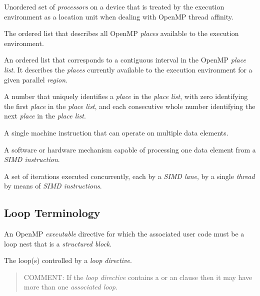 \newpage
{}
\glossarydefstart
Unordered set of \emph{processors} on a device that is treated by the execution environment as a 
location unit when dealing with OpenMP thread affinity.
\glossarydefend

\glossarydefstart
The ordered list that describes all OpenMP \emph{places} available to the execution 
environment.
\glossarydefend

\glossarydefstart
An ordered list that corresponds to a contiguous interval in the OpenMP \emph{place list}. 
It describes the \emph{places} currently available to the execution environment for a given 
parallel \emph{region}.
\glossarydefend

\glossarydefstart
A number that uniquely identifies a \emph{place} in the \emph{place list}, with zero identifying the first \emph{place} in the \emph{place list}, and each consecutive whole number identifying the next \emph{place} in the \emph{place list}.
\glossarydefend

\glossarydefstart
A single machine instruction that can operate on multiple data elements.
\glossarydefend

\glossarydefstart
A software or hardware mechanism capable of processing one data element from a 
\emph{SIMD instruction}.
\glossarydefend

\glossarydefstart
A set of iterations executed concurrently, each by a \emph{SIMD lane}, by a single \emph{thread}
by means of \emph{SIMD instructions}.
\glossarydefend


%
%
\subsection{Loop Terminology}
\label{subsec:Loop Terminology}
\glossarydefstart
An OpenMP \emph{executable} directive for which the associated user code must be a loop nest that is a \emph{structured block}.
\glossarydefend

\glossarydefstart
The loop(s) controlled by a \emph{loop directive}.
\begin{quote}
COMMENT: If the \emph{loop directive} contains a  or an \code{)} clause then it may have more than one \emph{associated loop}.
\end{quote}
\glossarydefend

